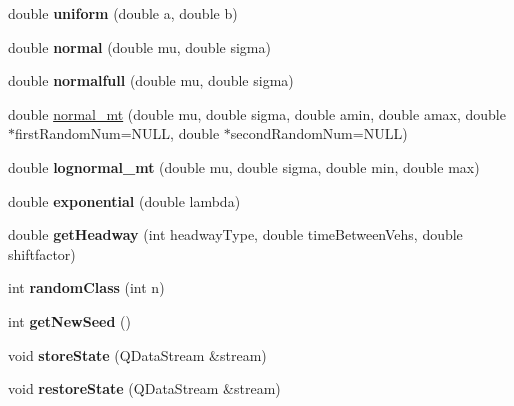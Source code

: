 \begin{DoxyCompactItemize}
\item 
double {\bfseries uniform} (double a, double b)\hypertarget{classARandomGenerator_a69017d79b869ef608affa8b82b1e607e}{}\label{classARandomGenerator_a69017d79b869ef608affa8b82b1e607e}

\item 
double {\bfseries normal} (double mu, double sigma)\hypertarget{classARandomGenerator_aec025a2421d67fded97e85ef6f7a2fca}{}\label{classARandomGenerator_aec025a2421d67fded97e85ef6f7a2fca}

\item 
double {\bfseries normalfull} (double mu, double sigma)\hypertarget{classARandomGenerator_acbef92da4df9b3c8de59341b71611440}{}\label{classARandomGenerator_acbef92da4df9b3c8de59341b71611440}

\item 
double \hyperlink{classARandomGenerator_a85e2f9a6b4c39d19c4bc4beadfa9dbfb}{normal\+\_\+mt} (double mu, double sigma, double amin, double amax, double $\ast$first\+Random\+Num=N\+U\+LL, double $\ast$second\+Random\+Num=N\+U\+LL)
\item 
double {\bfseries lognormal\+\_\+mt} (double mu, double sigma, double min, double max)\hypertarget{classARandomGenerator_aaad820ff562ed1242caa0de2baa1f51c}{}\label{classARandomGenerator_aaad820ff562ed1242caa0de2baa1f51c}

\item 
double {\bfseries exponential} (double lambda)\hypertarget{classARandomGenerator_a8b2d07c0d5523187adf4aa2e3f5b6670}{}\label{classARandomGenerator_a8b2d07c0d5523187adf4aa2e3f5b6670}

\item 
double {\bfseries get\+Headway} (int headway\+Type, double time\+Between\+Vehs, double shiftfactor)\hypertarget{classARandomGenerator_a495b02983cb88cd90de855296258fa8b}{}\label{classARandomGenerator_a495b02983cb88cd90de855296258fa8b}

\item 
int {\bfseries random\+Class} (int n)\hypertarget{classARandomGenerator_a1ab5c007ca0d56262c774f5c311f28b3}{}\label{classARandomGenerator_a1ab5c007ca0d56262c774f5c311f28b3}

\item 
int {\bfseries get\+New\+Seed} ()\hypertarget{classARandomGenerator_adf4750f97d3ae800643c7d8d61ffbf45}{}\label{classARandomGenerator_adf4750f97d3ae800643c7d8d61ffbf45}

\item 
void {\bfseries store\+State} (Q\+Data\+Stream \&stream)\hypertarget{classARandomGenerator_a6cfbac4a9b0aabd8b09ffbd7627202d2}{}\label{classARandomGenerator_a6cfbac4a9b0aabd8b09ffbd7627202d2}

\item 
void {\bfseries restore\+State} (Q\+Data\+Stream \&stream)\hypertarget{classARandomGenerator_a557b66ccbc65a2513c327b070ec74154}{}\label{classARandomGenerator_a557b66ccbc65a2513c327b070ec74154}

\end{DoxyCompactItemize}
